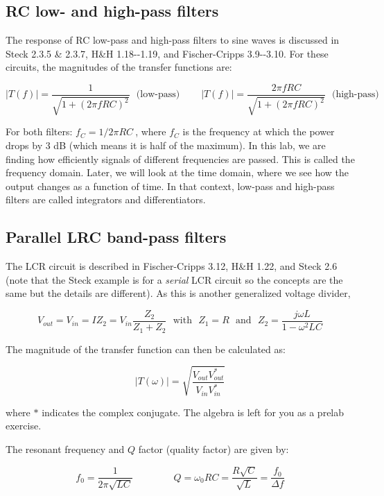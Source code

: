 \documentclass[10pt]{PhysLab1C} %
\begin{document}
\subsection{RC low- and high-pass filters}

The response of RC low-pass and high-pass filters to sine waves is
discussed in Steck 2.3.5 \& 2.3.7, H\&H 1.18-\/-1.19, and Fischer-Cripps
3.9-\/-3.10. For these circuits, the magnitudes of the transfer
functions are:

\[\left| T(f) \right| = \frac{1}{\sqrt{1 + (2\pi fRC)^{2}}} 
~~~\mbox{(low-pass)}
~~~~~~~~~~
\left| T(f) \right| = \frac{2\pi fRC}{\sqrt{1 + (2\pi fRC)^{2}}}
~~~\mbox{(high-pass)}\]

For both filters: \(f_{C} = 1/{2\pi RC}\ \), where \(f_{C}\) is the
frequency at which the power drops by 3 dB (which means it is half of
the maximum). In this lab, we are finding how efficiently signals of
different frequencies are passed. This is called the frequency domain.
Later, we will look at the time domain, where we see how the output
changes as a function of time. In that context, low-pass and high-pass
filters are called integrators and differentiators.

\subsection{Parallel LRC band-pass filters}

The LCR circuit is described in Fischer-Cripps 3.12, H\&H 1.22, and
Steck 2.6 (note that the Steck example is for a \emph{serial} LCR
circuit so the concepts are the same but the details are different). As
this is another generalized voltage divider,

\[V_{out} = V_{in} = IZ_{2} = V_{in}\frac{Z_{2}}{Z_{1} + Z_{2}} 
~~~\mbox{with} ~~~Z_{1} = R 
~~~\mbox{and} ~~~Z_{2} = \frac{j\omega L}{1 - \omega^{2}LC}\]

The magnitude of the transfer function can then be calculated as:

\[\left| T(\omega) \right| = \sqrt{\frac{V_{out}V_{out}^{*}}{V_{in}V_{in}^{*}}}\]

where \(*\) indicates the complex conjugate. The algebra is left for you
as a prelab exercise.

The resonant frequency and $Q$ factor (quality factor) are given by:

\[f_{0} = \frac{1}{2\pi\sqrt{LC}}
~~~~~~~~~~~~~~~~~~~Q = \omega_{0}RC = \frac{R\sqrt{C}}{\sqrt{L}} = \frac{f_{0}}{\Delta f}\]
\end{document}

